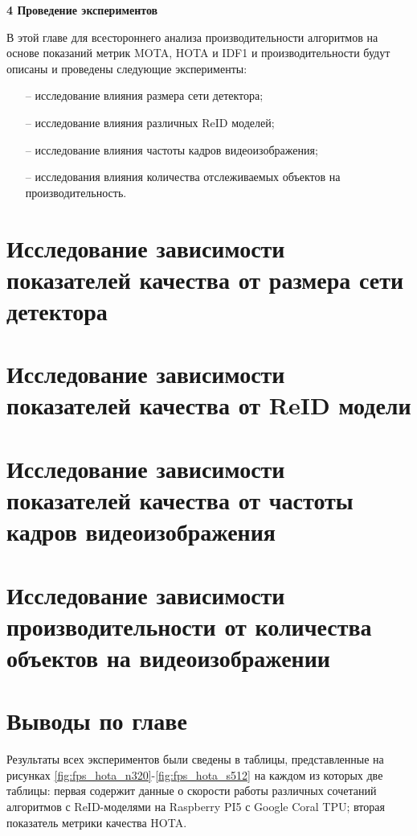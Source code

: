 \newpage
\begin{flushleft}
  \textbf{\large 4 Проведение экспериментов}
\end{flushleft}
В этой главе для всестороннего анализа производительности алгоритмов на основе показаний метрик MOTA, HOTA и IDF1 и производительности будут описаны и проведены следующие эксперименты:
\begin{itemize}
  \item[--] исследование влияния размера сети детектора;
  \item[--] исследование влияния различных ReID моделей;
  \item[--] исследование влияния частоты кадров видеоизображения;
  \item[--] исследования влияния количества отслеживаемых объектов на производительность.
\end{itemize}


\section{Исследование зависимости показателей качества от размера сети детектора}



\section{Исследование зависимости показателей качества от ReID модели}


\section{Исследование зависимости показателей качества от частоты кадров видеоизображения}


\section{Исследование зависимости производительности от количества объектов на видеоизображении}


\section{Выводы по главе}
Результаты всех экспериментов были сведены в таблицы, представленные на рисунках \ref{fig:fps_hota_n320}-\ref{fig:fps_hota_s512} на каждом из которых две таблицы: первая содержит данные о скорости работы различных сочетаний алгоритмов с ReID-моделями на Raspberry PI5 с Google Coral TPU; вторая показатель метрики качества HOTA. 

